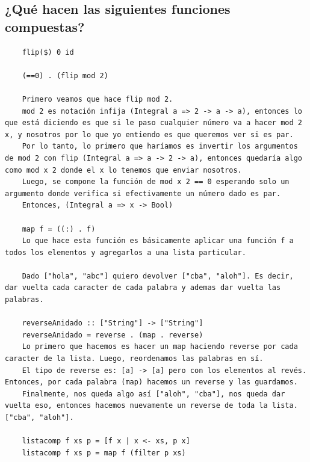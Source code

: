 \documentclass[10pt,a4paper]{article}
\begin{document}
\subsection*{¿Qué hacen las siguientes funciones compuestas?}
\begin{lstlisting}
    flip($) 0 id 

    (==0) . (flip mod 2)

    Primero veamos que hace flip mod 2.
    mod 2 es notación infija (Integral a => 2 -> a -> a), entonces lo que está diciendo es que si le paso cualquier número va a hacer mod 2 x, y nosotros por lo que yo entiendo es que queremos ver si es par.
    Por lo tanto, lo primero que haríamos es invertir los argumentos de mod 2 con flip (Integral a => a -> 2 -> a), entonces quedaría algo como mod x 2 donde el x lo tenemos que enviar nosotros.
    Luego, se compone la función de mod x 2 == 0 esperando solo un argumento donde verifica si efectivamente un número dado es par. 
    Entonces, (Integral a => x -> Bool)
    
    map f = ((:) . f)
    Lo que hace esta función es básicamente aplicar una función f a todos los elementos y agregarlos a una lista particular.
    
    Dado ["hola", "abc"] quiero devolver ["cba", "aloh"]. Es decir, dar vuelta cada caracter de cada palabra y ademas dar vuelta las palabras. 

    reverseAnidado :: ["String"] -> ["String"]
    reverseAnidado = reverse . (map . reverse) 
    Lo primero que hacemos es hacer un map haciendo reverse por cada caracter de la lista. Luego, reordenamos las palabras en sí.
    El tipo de reverse es: [a] -> [a] pero con los elementos al revés. Entonces, por cada palabra (map) hacemos un reverse y las guardamos.
    Finalmente, nos queda algo así ["aloh", "cba"], nos queda dar vuelta eso, entonces hacemos nuevamente un reverse de toda la lista. ["cba", "aloh"].
    
    listacomp f xs p = [f x | x <- xs, p x]
    listacomp f xs p = map f (filter p xs)
\end{lstlisting}
\end{document}
